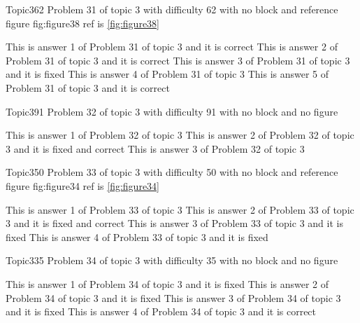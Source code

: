 \documentclass[master]{exam}
\begin{document}
\begin{problem}{Topic3}{62}
	Problem 31 of topic 3 with difficulty 62 with no block and reference figure fig:figure38 ref is \ref{fig:figure38}
	\begin{answers}
		\answer[correct] This is answer 1 of Problem 31 of topic 3 and it is correct
		\answer[correct] This is answer 2 of Problem 31 of topic 3 and it is correct
		\answer[fixed] This is answer 3 of Problem 31 of topic 3 and it is fixed
		\answer This is answer 4 of Problem 31 of topic 3 
		\answer[correct] This is answer 5 of Problem 31 of topic 3 and it is correct
	\end{answers}
\end{problem}

\begin{problem}{Topic3}{91}
	Problem 32 of topic 3 with difficulty 91 with no block and no figure
	\begin{answers}
		\answer This is answer 1 of Problem 32 of topic 3 
		 This is answer 2 of Problem 32 of topic 3 and it is fixed and correct
		\answer This is answer 3 of Problem 32 of topic 3 
	\end{answers}
\end{problem}

\begin{problem}{Topic3}{50}
	Problem 33 of topic 3 with difficulty 50 with no block and reference figure fig:figure34 ref is \ref{fig:figure34}
	\begin{answers}
		\answer This is answer 1 of Problem 33 of topic 3 
		 This is answer 2 of Problem 33 of topic 3 and it is fixed and correct
		\answer[fixed] This is answer 3 of Problem 33 of topic 3 and it is fixed
		\answer[fixed] This is answer 4 of Problem 33 of topic 3 and it is fixed
	\end{answers}
\end{problem}

\begin{problem}{Topic3}{35}
	Problem 34 of topic 3 with difficulty 35 with no block and no figure
	\begin{answers}
		\answer[fixed] This is answer 1 of Problem 34 of topic 3 and it is fixed
		\answer[fixed] This is answer 2 of Problem 34 of topic 3 and it is fixed
		\answer[fixed] This is answer 3 of Problem 34 of topic 3 and it is fixed
		\answer[correct] This is answer 4 of Problem 34 of topic 3 and it is correct
	\end{answers}
\end{problem}
\end{document}
